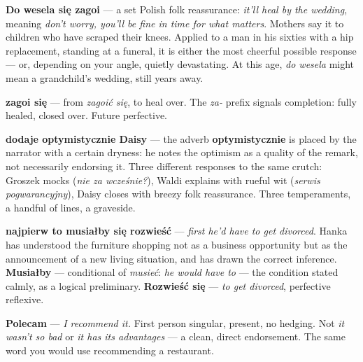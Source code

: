 
\textbf{Do wesela się zagoi} --- a set Polish folk reassurance:
\textit{it'll heal by the wedding}, meaning \textit{don't worry, you'll
be fine in time for what matters}. Mothers say it to children who have
scraped their knees. Applied to a man in his sixties with a hip
replacement, standing at a funeral, it is either the most cheerful
possible response --- or, depending on your angle, quietly devastating.
At this age, \textit{do wesela} might mean a grandchild's wedding,
still years away.

\textbf{zagoi się} --- from \textit{zagoić się}, to heal over. The
\textit{za-} prefix signals completion: fully healed, closed over.
Future perfective.

\textbf{dodaje optymistycznie Daisy} --- the adverb
\textbf{optymistycznie} is placed by the narrator with a certain
dryness: he notes the optimism as a quality of the remark, not
necessarily endorsing it. Three different responses to the same crutch:
Groszek mocks (\textit{nie za wcześnie?}), Waldi explains with rueful
wit (\textit{serwis pogwarancyjny}), Daisy closes with breezy folk
reassurance. Three temperaments, a handful of lines, a graveside.



\textbf{najpierw to musiałby się rozwieść} --- \textit{first he'd have
to get divorced}. Hanka has understood the furniture shopping not as a
business opportunity but as the announcement of a new living situation,
and has drawn the correct inference. \textbf{Musiałby} --- conditional
of \textit{musieć}: \textit{he would have to} --- the condition stated
calmly, as a logical preliminary. \textbf{Rozwieść się} ---
\textit{to get divorced}, perfective reflexive.

\textbf{Polecam} --- \textit{I recommend it.} First person singular,
present, no hedging. Not \textit{it wasn't so bad} or \textit{it has
its advantages} --- a clean, direct endorsement. The same word you
would use recommending a restaurant.

